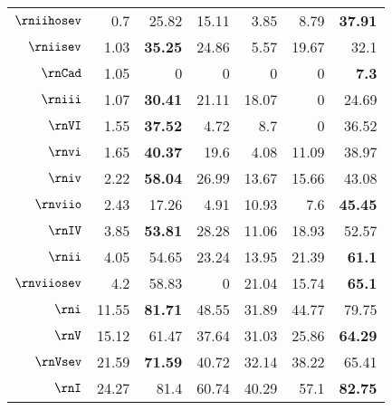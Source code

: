 \begin{table}[]
\begin{tabular}{rrrrrrr}
    $\rniihosev$  & 0.7                    & 25.82          & 15.11          & 3.85  & 8.79  & \textbf{37.91} \\
    $\rniisev$   & 1.03                   & \textbf{35.25} & 24.86          & 5.57  & 19.67 & 32.1           \\
    $\rnCad$   & 1.05                   & 0              & 0              & 0     & 0     & \textbf{7.3}   \\
    $\rniii$   & 1.07                   & \textbf{30.41} & 21.11          & 18.07 & 0     & 24.69          \\
    $\rnVI$    & 1.55                   & \textbf{37.52} & 4.72           & 8.7   & 0     & 36.52          \\
    $\rnvi$    & 1.65                   & \textbf{40.37} & 19.6           & 4.08  & 11.09 & 38.97          \\
    $\rniv$    & 2.22                   & \textbf{58.04} & 26.99          & 13.67 & 15.66 & 43.08          \\
    $\rnviio$  & 2.43                   & 17.26          & 4.91           & 10.93 & 7.6   & \textbf{45.45} \\
    $\rnIV$    & 3.85                   & \textbf{53.81} & 28.28          & 11.06 & 18.93 & 52.57          \\
    $\rnii$    & 4.05                   & 54.65          & 23.24          & 13.95 & 21.39 & \textbf{61.1}  \\
    $\rnviiosev$ & 4.2                    & 58.83          & 0              & 21.04 & 15.74 & \textbf{65.1}  \\
    $\rni$     & 11.55                  & \textbf{81.71} & 48.55          & 31.89 & 44.77 & 79.75          \\
    $\rnV$     & 15.12                  & 61.47          & 37.64          & 31.03 & 25.86 & \textbf{64.29} \\
    $\rnVsev$    & 21.59                  & \textbf{71.59} & 40.72          & 32.14 & 38.22 & 65.41          \\
    $\rnI$     & 24.27                  & 81.4           & 60.74          & 40.29 & 57.1  & \textbf{82.75}
    \end{tabular}
    \end{table}
